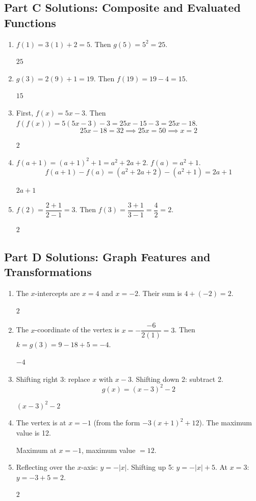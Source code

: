 \documentclass[14pt]{extarticle}
\begin{document}
\subsection*{Part C Solutions: Composite and Evaluated Functions}
\begin{enumerate}
  \item \(f(1) = 3(1) + 2 = 5\). Then \(g(5) = 5^2 = 25\).

  \(\boxed{25}\)

  \item \(g(3) = 2(9) + 1 = 19\). Then \(f(19) = 19 - 4 = 15\).

  \(\boxed{15}\)

  \item First, \(f(x) = 5x - 3\). Then \(f(f(x)) = 5(5x - 3) - 3 = 25x - 15 - 3 = 25x - 18\).
  \[
  25x - 18 = 32 \implies 25x = 50 \implies x = 2
  \]

  \(\boxed{2}\)

  \item \(f(a + 1) = (a+1)^2 + 1 = a^2 + 2a + 2\). \(f(a) = a^2 + 1\).
  \[
  f(a+1) - f(a) = (a^2 + 2a + 2) - (a^2 + 1) = 2a + 1
  \]

  \(\boxed{2a + 1}\)

  \item \(f(2) = \dfrac{2 + 1}{2 - 1} = 3\). Then \(f(3) = \dfrac{3 + 1}{3 - 1} = \dfrac{4}{2} = 2\).

  \(\boxed{2}\)
\end{enumerate}

\subsection*{Part D Solutions: Graph Features and Transformations}
\begin{enumerate}
  \item The \(x\)-intercepts are \(x = 4\) and \(x = -2\). Their sum is \(4 + (-2) = 2\).

  \(\boxed{2}\)

  \item The \(x\)-coordinate of the vertex is \(x = -\dfrac{-6}{2(1)} = 3\). Then \(k = g(3) = 9 - 18 + 5 = -4\).

  \(\boxed{-4}\)

  \item Shifting right 3: replace \(x\) with \(x - 3\). Shifting down 2: subtract 2.
  \[
  g(x) = (x - 3)^2 - 2
  \]

  \(\boxed{(x-3)^2 - 2}\)

  \item The vertex is at \(x = -1\) (from the form \(-3(x + 1)^2 + 12\)). The maximum value is 12.

  Maximum at \(x = \boxed{-1}\), maximum value \(= \boxed{12}\).

  \item Reflecting over the \(x\)-axis: \(y = -|x|\). Shifting up 5: \(y = -|x| + 5\). At \(x = 3\): \(y = -3 + 5 = 2\).

  \(\boxed{2}\)
\end{enumerate}
\end{document}
